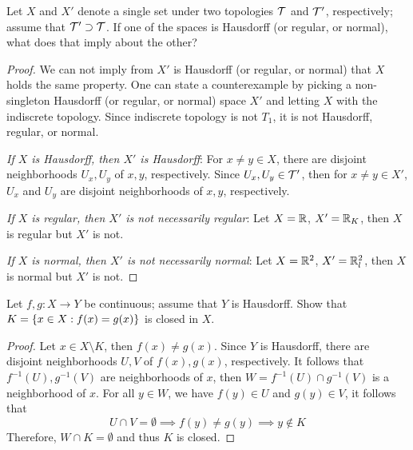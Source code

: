 \documentclass[12pt,a4paper]{article}
\begin{document}
    \begin{ex}
        Let $X$ and $X'$ denote a single set under two topologies $\mathcal{T}$ and $\mathcal{T}'$, respectively; assume that $\mathcal{T}'\supset\mathcal{T}$. If one of the spaces is Hausdorff (or regular, or normal), what does that imply about the other?
    \end{ex}
    \begin{proof}
        We can not imply from $X'$ is Hausdorff (or regular, or normal) that $X$ holds the same property. One can state a counterexample by picking a non-singleton Hausdorff (or regular, or normal) space $X'$ and letting $X$ with the indiscrete topology. Since indiscrete topology is not $T_1$, it is not Hausdorff, regular, or normal.
        
        \textit{If $X$ is Hausdorff, then $X'$ is Hausdorff}: For $x\neq y\in X$, there are disjoint neighborhoods $U_x,U_y$ of $x,y$, respectively. Since $U_x,U_y\in \mathcal{T}'$, then for $x\neq y\in X'$, $U_x$ and $U_y$ are disjoint neighborhoods of $x,y$, respectively.

        \textit{If $X$ is regular, then $X'$ is not necessarily regular}: Let $X=\mathbb{R}$, $X'=\mathbb{R}_K$, then $X$ is regular but $X'$ is not.

        \textit{If $X$ is normal, then $X'$ is not necessarily normal}: Let $X=\mathbb{R}^2$, $X'=\mathbb{R}^2_l$, then $X$ is normal but $X'$ is not.
    \end{proof}
    \hfill

    \begin{ex}
        Let $f,g:X\to Y$ be continuous; assume that $Y$ is Hausdorff. Show that $K=\left\{x\in X:f(x)=g(x)\right\}$ is closed in $X$.
    \end{ex}
    \begin{proof}
        Let $x\in X\setminus K$, then $f(x)\neq g(x)$. Since $Y$ is Hausdorff, there are disjoint neighborhoods $U,V$ of $f(x),g(x)$, respectively. It follows that $f^{-1}(U),g^{-1}(V)$ are neighborhoods of $x$, then $W=f^{-1}(U)\cap g^{-1}(V)$ is a neighborhood of $x$. For all $y\in W$, we have $f(y)\in U$ and $g(y)\in V$, it follows that
        $$
        U\cap V=\emptyset\implies f(y)\neq g(y)\implies y\notin K
        $$
        Therefore, $W\cap K=\emptyset$ and thus $K$ is closed.
    \end{proof}
    \hfill
\end{document}
